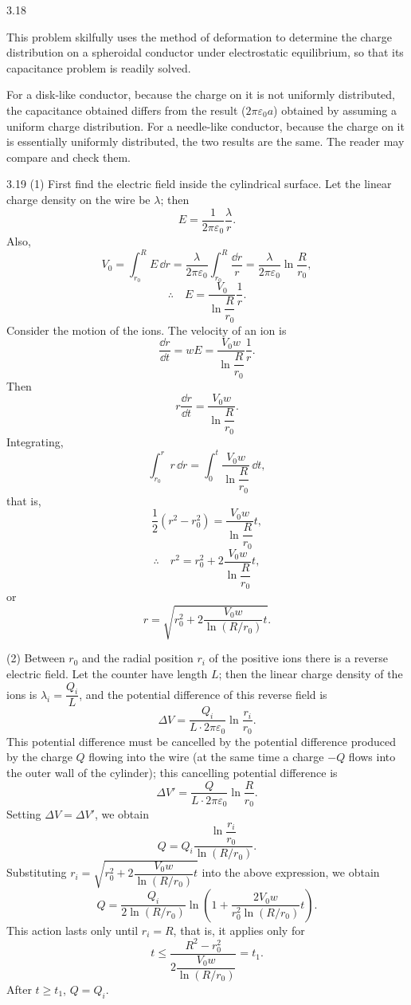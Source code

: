 \begin{solution}{3.18}
\begin{commentary}
This problem skilfully uses the method of deformation to determine the charge distribution on a spheroidal conductor under electrostatic equilibrium, so that its capacitance problem is readily solved.

For a disk-like conductor, because the charge on it is not uniformly distributed, the capacitance obtained differs from the result ($2\pi\varepsilon_0a$) obtained by assuming a uniform charge distribution. For a needle-like conductor, because the charge on it is essentially uniformly distributed, the two results are the same. The reader may compare and check them.
\end{commentary}
\end{solution}

\begin{solution}{3.19}
(1) First find the electric field inside the cylindrical surface. Let the linear charge density on the wire be $\lambda$; then
\[
E=\frac{1}{2\pi\varepsilon_0}\frac{\lambda}{r}.
\]
Also,
\[
V_0=\int_{r_0}^R E\,\dd r=\frac{\lambda}{2\pi\varepsilon_0}\int_{r_0}^R\frac{\dd r}{r}
=\frac{\lambda}{2\pi\varepsilon_0}\ln\frac{R}{r_0},
\]
\[
\therefore\quad E=\frac{V_0}{\ln\dfrac{R}{r_0}}\frac{1}{r}.
\]
Consider the motion of the ions. The velocity of an ion is
\[
\frac{\dd r}{\dd t}=wE=\frac{V_0w}{\ln\dfrac{R}{r_0}}\frac{1}{r}.
\]
Then
\[
r\frac{\dd r}{\dd t}=\frac{V_0w}{\ln\dfrac{R}{r_0}}.
\]
Integrating,
\[
\int_{r_0}^r r\,\dd r=\int_0^t\frac{V_0w}{\ln\dfrac{R}{r_0}}\,\dd t,
\]
that is,
\[
\frac{1}{2}\left(r^2-r_0^2\right)=\frac{V_0w}{\ln\dfrac{R}{r_0}}t,
\]
\[
\therefore\quad r^2=r_0^2+2\frac{V_0w}{\ln\dfrac{R}{r_0}}t,
\]
or
\[
r=\sqrt{r_0^2+2\frac{V_0w}{\ln(R/r_0)}t}.
\]

(2) Between $r_0$ and the radial position $r_i$ of the positive ions there is a reverse electric field. Let the counter have length $L$; then the linear charge density of the ions is $\lambda_i=\dfrac{Q_i}{L}$, and the potential difference of this reverse field is
\[
\Delta V=\frac{Q_i}{L\cdot2\pi\varepsilon_0}\ln\frac{r_i}{r_0}.
\]
This potential difference must be cancelled by the potential difference produced by the charge $Q$ flowing into the wire (at the same time a charge $-Q$ flows into the outer wall of the cylinder); this cancelling potential difference is
\[
\Delta V'=\frac{Q}{L\cdot2\pi\varepsilon_0}\ln\frac{R}{r_0}.
\]
Setting $\Delta V=\Delta V'$, we obtain
\[
Q=Q_i\frac{\ln\dfrac{r_i}{r_0}}{\ln(R/r_0)}.
\]
Substituting $r_i=\sqrt{r_0^2+2\dfrac{V_0w}{\ln(R/r_0)}t}$ into the above expression, we obtain
\[
Q=\frac{Q_i}{2\ln(R/r_0)}\ln\left(1+\frac{2V_0w}{r_0^2\ln(R/r_0)}t\right).
\]
This action lasts only until $r_i=R$, that is, it applies only for
\[
t\le\frac{R^2-r_0^2}{2\dfrac{V_0w}{\ln(R/r_0)}}=t_1.
\]
After $t\ge t_1$, $Q=Q_i$.
\end{solution}

